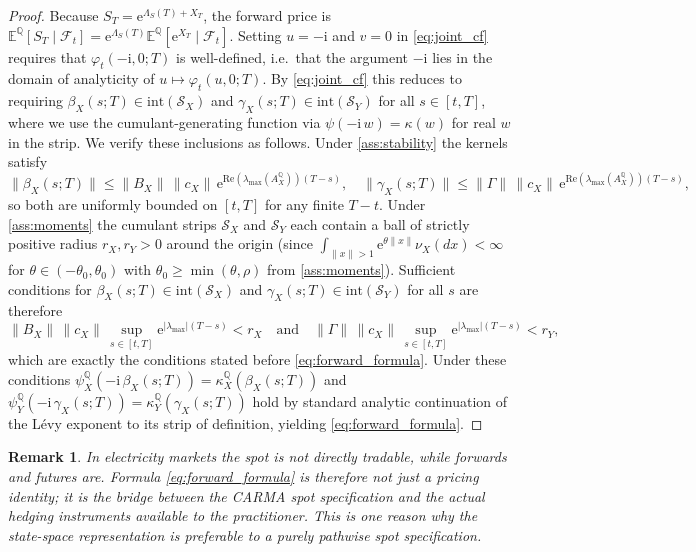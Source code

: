 \documentclass[10pt,a4paper,reqno]{amsart}
\newtheorem{remark}[theorem]{Remark}
\newcommand{\E}{\mathbb{E}}
\newcommand{\Q}{\mathbb{Q}}
\newcommand{\F}{\mathcal{F}}
\newcommand{\1}{\mathbbm{1}}
\newcommand{\ii}{\mathrm{i}}
\newcommand{\ee}{\mathrm{e}}
\begin{document}
\begin{proof}
Because $S_T = \ee^{\Lambda_S(T)+X_T}$, the forward price is
$\E^\Q[S_T\mid\F_t] = \ee^{\Lambda_S(T)} \E^\Q[\ee^{X_T}\mid\F_t]$.
Setting $u = -\ii$ and $v = 0$ in \eqref{eq:joint_cf} requires that
$\varphi_t(-\ii,0;T)$ is well-defined, i.e.\ that the argument $-\ii$ lies in the
domain of analyticity of $u \mapsto \varphi_t(u,0;T)$.
By \eqref{eq:joint_cf} this reduces to requiring
$\beta_X(s;T) \in \mathrm{int}(\mathcal{S}_X)$ and
$\gamma_X(s;T) \in \mathrm{int}(\mathcal{S}_Y)$ for all $s \in [t,T]$,
where we use the cumulant-generating function via $\psi(-\ii\,w) = \kappa(w)$ for
real $w$ in the strip.
We verify these inclusions as follows.
Under \ref{ass:stability} the kernels satisfy
$$
  \|\beta_X(s;T)\|
  \le \|B_X\|\,\|c_X\|\,
      \ee^{\mathrm{Re}(\lambda_{\max}(A_X^\Q))(T-s)},
  \quad
  \|\gamma_X(s;T)\|
  \le \|\Gamma\|\,\|c_X\|\,
      \ee^{\mathrm{Re}(\lambda_{\max}(A_X^\Q))(T-s)},
$$
so both are uniformly bounded on $[t,T]$ for any finite $T - t$.
Under \ref{ass:moments} the cumulant strips
$\mathcal{S}_X$ and $\mathcal{S}_Y$ each contain a ball of strictly positive
radius $r_X, r_Y > 0$ around the origin
(since $\int_{\|x\|>1}\ee^{\theta\|x\|}\nu_X(dx) < \infty$ for
$\theta \in (-\theta_0,\theta_0)$ with $\theta_0 \ge \min(\theta,\rho)$
from \ref{ass:moments}).
Sufficient conditions for $\beta_X(s;T) \in \mathrm{int}(\mathcal{S}_X)$ and
$\gamma_X(s;T) \in \mathrm{int}(\mathcal{S}_Y)$ for all $s$ are therefore
$$
  \|B_X\|\,\|c_X\|\,
    \sup_{s \in [t,T]}\ee^{|\lambda_{\max}|(T-s)} < r_X
  \quad\text{and}\quad
  \|\Gamma\|\,\|c_X\|\,
    \sup_{s \in [t,T]}\ee^{|\lambda_{\max}|(T-s)} < r_Y,
$$
which are exactly the conditions stated before \eqref{eq:forward_formula}.
Under these conditions $\psi_X^\Q(-\ii\,\beta_X(s;T)) = \kappa_X^\Q(\beta_X(s;T))$
and $\psi_Y^\Q(-\ii\,\gamma_X(s;T)) = \kappa_Y^\Q(\gamma_X(s;T))$ hold by
standard analytic continuation of the Lévy exponent to its strip of definition,
yielding \eqref{eq:forward_formula}.
\end{proof}

\begin{remark}
In electricity markets the spot is not directly tradable, while forwards and
futures are. Formula \eqref{eq:forward_formula} is therefore not just a pricing
identity; it is the bridge between the CARMA spot specification and the actual
hedging instruments available to the practitioner. This is one reason why the
state-space representation is preferable to a purely pathwise spot specification.
\end{remark}
\end{document}
